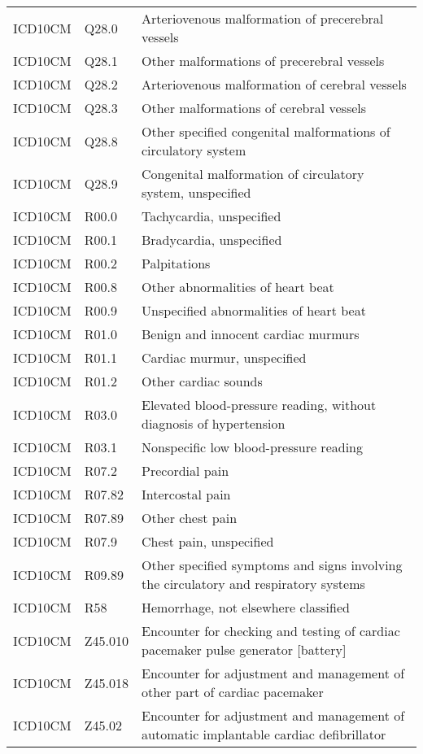 \begin{longtable}{p{}p{}p{}}
  ICD10CM & Q28.0 & Arteriovenous malformation of precerebral vessels \\ 
  ICD10CM & Q28.1 & Other malformations of precerebral vessels \\ 
  ICD10CM & Q28.2 & Arteriovenous malformation of cerebral vessels \\ 
  ICD10CM & Q28.3 & Other malformations of cerebral vessels \\ 
  ICD10CM & Q28.8 & Other specified congenital malformations of circulatory system \\ 
  ICD10CM & Q28.9 & Congenital malformation of circulatory system, unspecified \\ 
  ICD10CM & R00.0 & Tachycardia, unspecified \\ 
  ICD10CM & R00.1 & Bradycardia, unspecified \\ 
  ICD10CM & R00.2 & Palpitations \\ 
  ICD10CM & R00.8 & Other abnormalities of heart beat \\ 
  ICD10CM & R00.9 & Unspecified abnormalities of heart beat \\ 
  ICD10CM & R01.0 & Benign and innocent cardiac murmurs \\ 
  ICD10CM & R01.1 & Cardiac murmur, unspecified \\ 
  ICD10CM & R01.2 & Other cardiac sounds \\ 
  ICD10CM & R03.0 & Elevated blood-pressure reading, without diagnosis of hypertension \\ 
  ICD10CM & R03.1 & Nonspecific low blood-pressure reading \\ 
  ICD10CM & R07.2 & Precordial pain \\ 
  ICD10CM & R07.82 & Intercostal pain \\ 
  ICD10CM & R07.89 & Other chest pain \\ 
  ICD10CM & R07.9 & Chest pain, unspecified \\ 
  ICD10CM & R09.89 & Other specified symptoms and signs involving the circulatory and respiratory systems \\ 
  ICD10CM & R58 & Hemorrhage, not elsewhere classified \\ 
  ICD10CM & Z45.010 & Encounter for checking and testing of cardiac pacemaker pulse generator [battery] \\ 
  ICD10CM & Z45.018 & Encounter for adjustment and management of other part of cardiac pacemaker \\ 
  ICD10CM & Z45.02 & Encounter for adjustment and management of automatic implantable cardiac defibrillator \\ 

\end{longtable}
